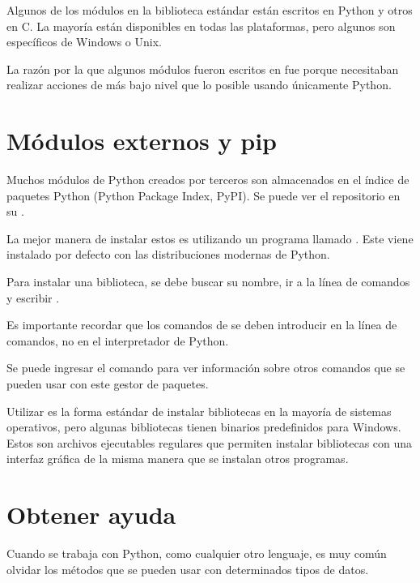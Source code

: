 Algunos de los módulos en la biblioteca estándar están escritos en Python y otros en C.
La mayoría están disponibles en todas las plataformas, pero algunos son específicos de Windows o Unix.
\medskip

La razón por la que algunos módulos fueron escritos en  fue porque necesitaban realizar acciones de más bajo nivel que lo posible usando únicamente Python.

\section{Módulos externos y pip}

Muchos módulos de Python creados por terceros son almacenados en el índice de paquetes Python (Python Package Index, PyPI).
Se puede ver el repositorio en su .
\medskip

La mejor manera de instalar estos es utilizando un programa llamado .
Este viene instalado por defecto con las distribuciones modernas de Python.
\medskip

Para instalar una biblioteca, se debe buscar su nombre, ir a la línea de comandos y escribir .


Es importante recordar que los comandos de  se deben introducir en la línea de comandos, no en el interpretador de Python.
\medskip

Se puede ingresar el comando  para ver información sobre otros comandos que se pueden usar con este gestor de paquetes.


Utilizar  es la forma estándar de instalar bibliotecas en la mayoría de sistemas operativos, pero algunas bibliotecas tienen binarios predefinidos para Windows.
Estos son archivos ejecutables regulares que permiten instalar bibliotecas con una interfaz gráfica de la misma manera que se instalan otros programas.

\section{Obtener ayuda}

Cuando se trabaja con Python, como cualquier otro lenguaje, es muy común olvidar los métodos que se pueden usar con determinados tipos de datos.
\medskip

